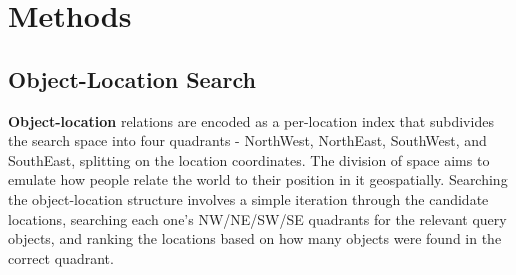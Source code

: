 \section{Methods}
\label{section:methods}

\subsection{Object-Location Search}
\textbf{Object-location} relations are encoded as a per-location index that subdivides the search space into four quadrants - NorthWest, NorthEast, SouthWest, and SouthEast, splitting on the location coordinates. The division of space aims to emulate how people relate the world to their position in it geospatially. 
Searching the object-location structure involves a simple iteration through the candidate locations, searching each one's NW/NE/SW/SE quadrants for the relevant query objects, and ranking the locations based on how many objects were found in the correct quadrant.






